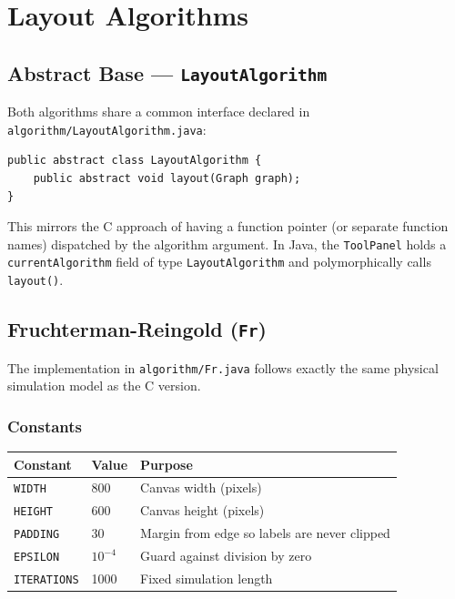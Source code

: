 \documentclass[12pt,a4paper]{article}
\begin{document}
\section{Layout Algorithms}

\subsection{Abstract Base — \texttt{LayoutAlgorithm}}

Both algorithms share a common interface declared in
\texttt{algorithm/LayoutAlgorithm.java}:

\begin{lstlisting}[caption={Abstract base class}]
public abstract class LayoutAlgorithm {
    public abstract void layout(Graph graph);
}
\end{lstlisting}

This mirrors the C approach of having a function pointer (or separate
function names) dispatched by the algorithm argument. In Java, the
\texttt{ToolPanel} holds a \texttt{currentAlgorithm} field of type
\texttt{LayoutAlgorithm} and polymorphically calls \texttt{layout()}.

\subsection{Fruchterman-Reingold (\texttt{Fr})}

The implementation in \texttt{algorithm/Fr.java} follows exactly the same
physical simulation model as the C version.

\subsubsection*{Constants}

\begin{center}
\begin{tabular}{lll}
\toprule
\textbf{Constant} & \textbf{Value} & \textbf{Purpose} \\
\midrule
\texttt{WIDTH}      & 800   & Canvas width (pixels) \\
\texttt{HEIGHT}     & 600   & Canvas height (pixels) \\
\texttt{PADDING}    & 30    & Margin from edge so labels are never clipped \\
\texttt{EPSILON}    & $10^{-4}$ & Guard against division by zero \\
\texttt{ITERATIONS} & 1000  & Fixed simulation length \\
\bottomrule
\end{tabular}
\end{center}
\end{document}
